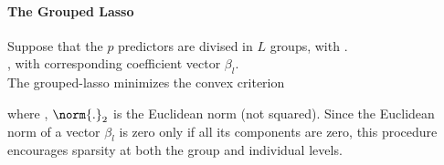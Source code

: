 \paragraph{The Grouped Lasso}
Suppose that the $p$ predictors are divised in $L$ groups, with .
\\
, with corresponding 
coefficient vector $\beta_{l}$.\\
The grouped-lasso minimizes the convex criterion
\begin{center}
\end{center}
where , $\norm{.}_{2}$ is the 
Euclidean norm (not squared). Since the Euclidean norm of a vector $\beta_{l}$ is zero only if all 
its components are zero, this procedure encourages sparsity at both the group and individual levels.
